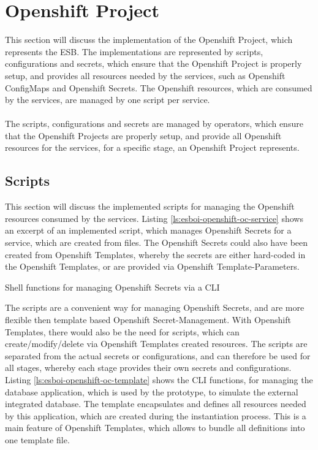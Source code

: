 \section{Openshift Project}
\label{sec:esbi-openshift}
This section will discuss the implementation of the Openshift Project, which represents the ESB. The implementations are represented by scripts, configurations and secrets, which ensure that the Openshift Project is properly setup, and provides all resources needed by the services, such as Openshift ConfigMaps and Openshift Secrets. The Openshift resources, which are consumed by the services, are managed by one script per service. 
\\ \\
The scripts, configurations and secrets are managed by operators, which ensure that the Openshift Projects are properly setup, and provide all Openshift resources for the services, for a specific stage, an Openshift Project represents.

\subsection{Scripts}
\label{sec:esbi-openshift-secrets}
This section will discuss the implemented scripts for managing the Openshift resources consumed by the services. Listing \vref{ls:esboi-openshift-oc-service} shows an excerpt of an implemented script, which manages Openshift Secrets for a service, which are created from files. The Openshift Secrets could also have been created from Openshift Templates, whereby the secrets are either hard-coded in the Openshift Templates, or are provided via Openshift Template-Parameters.

\begin{listing}[h]
	\caption{Shell functions for managing Openshift Secrets via a CLI}
	\label{ls:esboi-openshift-oc-service}
\end{listing}

The scripts are a convenient way for managing Openshift Secrets, and are more flexible then template based Openshift Secret-Management. With Openshift Templates, there would also be the need for scripts, which can create/modify/delete via Openshift Templates created resources. The scripts are separated from the actual secrets or configurations, and can therefore be used for all stages, whereby each stage provides their own secrets and configurations. \\

Listing \vref{ls:esboi-openshift-oc-template} shows the CLI functions, for managing the database application, which is used by the prototype, to simulate the external integrated database. The template encapsulates and defines all resources needed by this application, which are created during the instantiation process. This is a main feature of Openshift Templates, which allows to bundle all definitions into one template file.
 
